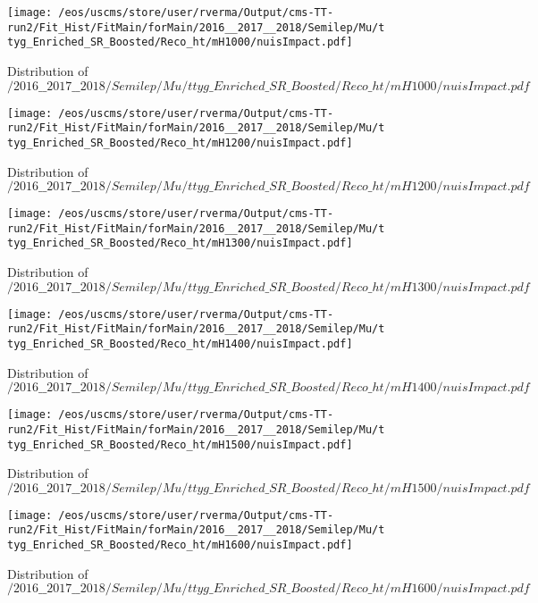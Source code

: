 \begin{figure}
\centering
\texttt{[image: /eos/uscms/store/user/rverma/Output/cms-TT-run2/Fit\_Hist/FitMain/forMain/2016\_\_2017\_\_2018/Semilep/Mu/ttyg\_Enriched\_SR\_Boosted/Reco\_ht/mH1000/nuisImpact.pdf]}
\caption{Distribution of $/2016\_\_2017\_\_2018/Semilep/Mu/ttyg\_Enriched\_SR\_Boosted/Reco\_ht/mH1000/nuisImpact.pdf$}
\end{figure}

\begin{figure}
\centering
\texttt{[image: /eos/uscms/store/user/rverma/Output/cms-TT-run2/Fit\_Hist/FitMain/forMain/2016\_\_2017\_\_2018/Semilep/Mu/ttyg\_Enriched\_SR\_Boosted/Reco\_ht/mH1200/nuisImpact.pdf]}
\caption{Distribution of $/2016\_\_2017\_\_2018/Semilep/Mu/ttyg\_Enriched\_SR\_Boosted/Reco\_ht/mH1200/nuisImpact.pdf$}
\end{figure}

\begin{figure}
\centering
\texttt{[image: /eos/uscms/store/user/rverma/Output/cms-TT-run2/Fit\_Hist/FitMain/forMain/2016\_\_2017\_\_2018/Semilep/Mu/ttyg\_Enriched\_SR\_Boosted/Reco\_ht/mH1300/nuisImpact.pdf]}
\caption{Distribution of $/2016\_\_2017\_\_2018/Semilep/Mu/ttyg\_Enriched\_SR\_Boosted/Reco\_ht/mH1300/nuisImpact.pdf$}
\end{figure}

\begin{figure}
\centering
\texttt{[image: /eos/uscms/store/user/rverma/Output/cms-TT-run2/Fit\_Hist/FitMain/forMain/2016\_\_2017\_\_2018/Semilep/Mu/ttyg\_Enriched\_SR\_Boosted/Reco\_ht/mH1400/nuisImpact.pdf]}
\caption{Distribution of $/2016\_\_2017\_\_2018/Semilep/Mu/ttyg\_Enriched\_SR\_Boosted/Reco\_ht/mH1400/nuisImpact.pdf$}
\end{figure}

\begin{figure}
\centering
\texttt{[image: /eos/uscms/store/user/rverma/Output/cms-TT-run2/Fit\_Hist/FitMain/forMain/2016\_\_2017\_\_2018/Semilep/Mu/ttyg\_Enriched\_SR\_Boosted/Reco\_ht/mH1500/nuisImpact.pdf]}
\caption{Distribution of $/2016\_\_2017\_\_2018/Semilep/Mu/ttyg\_Enriched\_SR\_Boosted/Reco\_ht/mH1500/nuisImpact.pdf$}
\end{figure}

\begin{figure}
\centering
\texttt{[image: /eos/uscms/store/user/rverma/Output/cms-TT-run2/Fit\_Hist/FitMain/forMain/2016\_\_2017\_\_2018/Semilep/Mu/ttyg\_Enriched\_SR\_Boosted/Reco\_ht/mH1600/nuisImpact.pdf]}
\caption{Distribution of $/2016\_\_2017\_\_2018/Semilep/Mu/ttyg\_Enriched\_SR\_Boosted/Reco\_ht/mH1600/nuisImpact.pdf$}
\end{figure}

